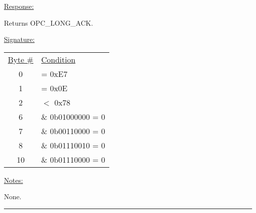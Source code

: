 \underline{Response:} 

Returns OPC\_LONG\_ACK.

\underline{Signature:}

\begin{tabular}{c l}
\underline{Byte \#} & \underline{Condition}\\
0 & = 0xE7\\
1 & = 0x0E\\
2 & $<$ 0x78\\
6 & \& 0b01000000 = 0\\
7 & \& 0b00110000 = 0\\
8 & \& 0b01110010 = 0\\
10 & \& 0b01110000 = 0\\
\end{tabular}

\underline{Notes:} 

None.

\rule{15.1cm}{0.4pt}

